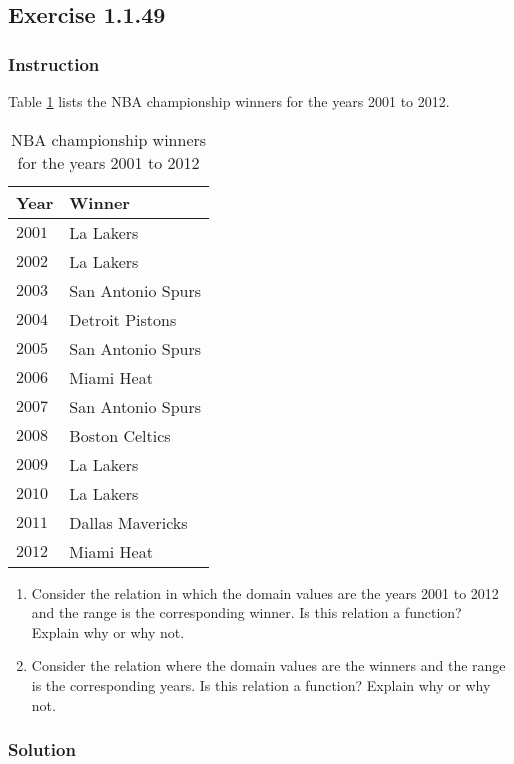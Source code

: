 \subsection*{Exercise 1.1.49}

\subsubsection*{Instruction}

Table \ref{table:exercise-1.1.49} lists the NBA championship winners for the years 2001 to 2012.

\begin{table}[ht]
  \centering
  \begin{tabular}{ l l }
    \hline
    Year & Winner \\
    \hline
    $ 2001 $ & La Lakers \\
    $ 2002 $ & La Lakers \\
    $ 2003 $ & San Antonio Spurs \\
    $ 2004 $ & Detroit Pistons \\
    $ 2005 $ & San Antonio Spurs \\
    $ 2006 $ & Miami Heat \\
    $ 2007 $ & San Antonio Spurs \\
    $ 2008 $ & Boston Celtics \\
    $ 2009 $ & La Lakers \\
    $ 2010 $ & La Lakers \\
    $ 2011 $ & Dallas Mavericks \\
    $ 2012 $ & Miami Heat \\
    \hline
  \end{tabular}
  \caption{NBA championship winners for the years 2001 to 2012}
  \label{table:exercise-1.1.49}
\end{table}

\begin{enumerate}[label = (\alph*)]
  \item
    Consider the relation in which the domain values are the years 2001 to 2012 and the range is the corresponding winner. Is this relation a function? Explain why or why not.
  \item
    Consider the relation where the domain values are the winners and the range is the corresponding years. Is this relation a function? Explain why or why not.
\end{enumerate}

\subsubsection*{Solution}

